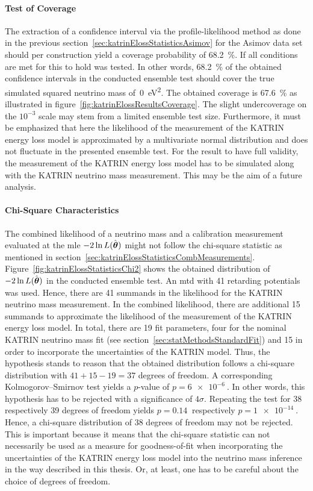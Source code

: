 \paragraph{Test of Coverage}
The extraction of a confidence interval via the profile-likelihood method as done in the previous section~\ref{sec:katrinElossStatisticsAsimov} for the Asimov data set should per construction yield a coverage probability of \SI{68.2}{\percent}. If all conditions are met for this to hold was tested. In other words, \SI{68.2}{\percent} of the obtained confidence intervals in the conducted ensemble test should cover the true simulated squared neutrino mass of~\SI{0}{eV^2}. The obtained coverage is \SI{67.6}{\percent} as illustrated in figure~\ref{fig:katrinElossResultsCoverage}. The slight undercoverage on the $10^{-3}$ scale may stem from a limited ensemble test size. Furthermore, it must be emphasized that here the likelihood of the measurement of the KATRIN energy loss model is approximated by a multivariate normal distribution and does not fluctuate in the presented ensemble test. For the result to have full validity, the measurement of the KATRIN energy loss model has to be simulated along with the KATRIN neutrino mass measurement. This may be the aim of a future analysis.

\paragraph{Chi-Square Characteristics}
The combined likelihood of a neutrino mass and a calibration measurement evaluated at the \gls{mle} $-2\ln L(\hat{\boldsymbol{\mathbf{\theta}}})$ might not follow the chi-square statistic as mentioned in section~\ref{sec:katrinElossStatisticsCombMeasurements}. Figure~\ref{fig:katrinElossStatisticsChi2} shows the obtained distribution of $-2\ln L(\hat{\boldsymbol{\mathbf{\theta}}})$ in the conducted ensemble test. An \gls{mtd} with 41 retarding potentials was used. Hence, there are 41 summands in the likelihood for the KATRIN neutrino mass measurement. In the combined likelihood, there are additional 15 summands to approximate the likelihood of the measurement of the KATRIN energy loss model. In total, there are 19 fit parameters, four for the nominal KATRIN neutrino mass fit (see section~\ref{sec:statMethodsStandardFit}) and 15 in order to incorporate the uncertainties of the KATRIN model. Thus, the hypothesis stands to reason that the obtained distribution follows a chi-square distribution with $41+15-19=37$ degrees of freedom. A corresponding Kolmogorov–Smirnov test yields a $p$-value of $p=\SI{6e-6}{}$. In other words, this hypothesis has to be rejected with a significance of $4\sigma$. Repeating the test for 38 respectively 39 degrees of freedom yields $p=\SI{0.14}{}$ respectively $p=\SI{1e-14}{}$. Hence, a chi-square distribution of 38 degrees of freedom may not be rejected. This is important because it means that the chi-square statistic can not necessarily be used as a measure for goodness-of-fit when incorporating the uncertainties of the KATRIN energy loss model into the neutrino mass inference in the way described in this thesis. Or, at least, one has to be careful about the choice of degrees of freedom.

